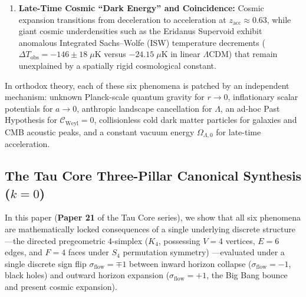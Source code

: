 \documentclass[11pt,a4paper]{article}
\theoremstyle{remark}
\begin{document}
\begin{enumerate}
  \item \textbf{Late-Time Cosmic ``Dark Energy'' and Coincidence:} Cosmic expansion transitions from deceleration to acceleration at $z_{\mathrm{acc}} \approx 0.63$, while giant cosmic underdensities such as the Eridanus Supervoid exhibit anomalous Integrated Sachs--Wolfe (ISW) temperature decrements ($\Delta T_{\mathrm{obs}} = -146 \pm 18\;\mu\mathrm{K}$ versus $-24.15\;\mu\mathrm{K}$ in linear $\Lambda\mathrm{CDM}$) \cite{Kovacs2022Eridanus} that remain unexplained by a spatially rigid cosmological constant.
\end{enumerate}

In orthodox theory, each of these six phenomena is patched by an independent mechanism: unknown Planck-scale quantum gravity for $r \to 0$, inflationary scalar potentials for $a \to 0$, anthropic landscape cancellation for $\Lambda$, an ad-hoc Past Hypothesis for $\mathcal{C}_{\mathrm{Weyl}} = 0$, collisionless cold dark matter particles for galaxies and CMB acoustic peaks, and a constant vacuum energy $\Omega_{\Lambda,0}$ for late-time acceleration.

\subsection{The Tau Core Three-Pillar Canonical Synthesis (\texorpdfstring{$k = 0$}{k = 0})}

In this paper (\textbf{Paper 21} of the Tau Core series), we show that all six phenomena are mathematically locked consequences of a single underlying discrete structure---the directed pregeometric 4-simplex ($K_4$, possessing $V = 4$ vertices, $E = 6$ edges, and $F = 4$ faces under $S_4$ permutation symmetry) \cite{JolcsakTauFoundationSeries2026,JolcsakTauPaper20Euclid2026}---evaluated under a single discrete sign flip $\sigma_{\mathrm{flow}} = \mp 1$ between inward horizon collapse ($\sigma_{\mathrm{flow}} = -1$, black holes) and outward horizon expansion ($\sigma_{\mathrm{flow}} = +1$, the Big Bang bounce and present cosmic expansion).
\end{document}
